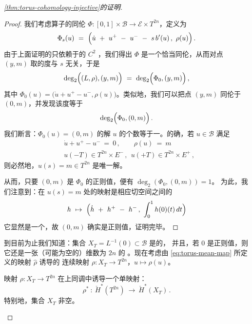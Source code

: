 \begin{proof}[\cref*{thm:torus-cohomology-injective}的证明]
\begin{proof}
我们考虑\trFredholm{}算子的\trSmooth{}同伦 $\Phi:[0,1]\times\mathcal{B}\to%
\mathcal{E}\times T^{2n}$，定义为
\begin{equation}\label{eq:torus-homotopy-phi}
\Phi_{s}(u)\ =\ \Bigl(\dot{u}\ +\ u^{+}\ -\ u^{-}\ -\ s\,b'(u)\,,\ \rho(u)\Bigr)\,.
\end{equation}
由于上面证明的\trCompactness{}只依赖于\trHamiltonianFunction{}的%
$C^{2}$ \trNorm，我们得出 $\Phi$ 是一个恰当同伦，从而对点 $(y,m)$ 取的度与%
$s$ 无关，于是
\[
\deg_{2}\Bigl((L,\rho),(y,m)\Bigr)\ =\ \deg_{2}\Bigl(\Phi_{0},(y,m)\Bigr)\,,
\]
其中 $\Phi_{0}(u)=\bigl(\dot{u}+u^{+}-u^{-},\rho(u)\bigr)$。类似地，我们可以把点%
$(y,m)$ 同伦于 $(0,m)$，并发现该度等于
\begin{equation}\label{eq:torus-degree-phi0}
\deg_{2}\Bigl(\Phi_{0},(0,m)\Bigr)\,.
\end{equation}
我们断言：$\Phi_{0}(u)=(0,m)$ 的解 $u$ 的个数等于一。的确，若 $u\in\mathcal{B}$%
满足
\[
\begin{aligned}
&\dot{u}+u^{+}-u^{-}\ =\ 0\,,\qquad\rho(u)\ =\ m\\
&u(-T)\in T^{2n}\times E^{-}\,,\ \ u(+T)\in T^{2n}\times E^{+}\,,
\end{aligned}
\]
则必然地，$u(s)=m\in T^{2n}$ 是唯一解。

从而，只要 $(0,m)$ 是 $\Phi_{0}$ 的正则值，便有 $\deg_{2}(\Phi_{0},(0,m))=1$。%
为此，我们注意到：在 $u(s)=m$ 处的\trLinearization{}映射是相应切空间之间的%
\trLinearOperator
\begin{equation}\label{eq:torus-linearized-phi0}
h\ \mapsto\ \Bigl(\dot{h}\ +\ h^{+}\ -\ h^{-}\,,\ \int_{0}^{1}h(0)(t)\,dt\Bigr)
\end{equation}
它显然是一个\trIsomorphism，故 $(0,m)$ 确实是正则值，证明完毕。
\end{proof}

到目前为止我们知道：集合 $X_{T}=L^{-1}(0)\subset\mathcal{B}$ 是\trCompact{}的，%
并且，若 $0$ 是正则值，则它还是一张（可能为空的）维数为 $2n$ 的%
\trSmooth\trManifold。现在考虑由 \eqref{eq:torus-mean-map} 所定义的映射 $\hat{\rho}$ 诱导的%
连续映射 $\rho:X_{T}\to T^{2n}$，$u\mapsto\rho(u)$。

\begin{proposition}\label{prop:rho-injective-xt}
映射 $\rho:X_{T}\to T^{2n}$ 在上同调中诱导一个单映射：
\[
\rho^{*}\ :\ \check{H}^{*}(T^{2n})\ \longrightarrow\ \check{H}^{*}(X_{T})\,.
\]
特别地，集合 $X_{T}$ 非空。
\end{proposition}


\end{proof}
